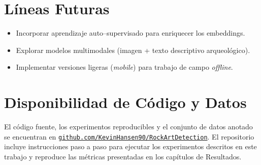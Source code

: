 \section{Líneas Futuras}
\begin{itemize}
  \item Incorporar aprendizaje auto–supervisado para enriquecer los embeddings.  
  \item Explorar modelos multimodales (imagen + texto descriptivo arqueológico).  
  \item Implementar versiones ligeras (\textit{mobile}) para trabajo de campo \emph{offline}.  
\end{itemize}

\section{Disponibilidad de Código y Datos}
El código fuente, los experimentos reproducibles y el conjunto de datos anotado se encuentran en \href{https://github.com/KevinHansen90/RockArtDetection}{\texttt{github.com/KevinHansen90/RockArtDetection}}.
El repositorio incluye instrucciones paso a paso para ejecutar los experimentos descritos en este trabajo y reproduce las métricas presentadas en los capítulos de Resultados.